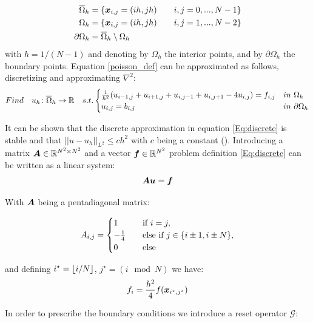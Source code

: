 \documentclass{rescience} %
\begin{document}
\begin{align*}
\overline{\Omega}_h &= \{{\bm{x}}_{i,j} = (ih, jh) \qquad i,j = 0,...,N-1 \} \\
{\Omega}_h &= \{{\bm{x}}_{i,j} = (ih, jh) \qquad i,j = 1,...,N-2 \} \\
\partial\Omega_h &= \overline{\Omega}_h \setminus {\Omega}_h
\end{align*}
with $h=1/(N-1)$ and denoting by ${\Omega}_h$ the interior points, and by $\partial\Omega_h$ the boundary points.
Equation \ref{poisson_def} can be approximated as follows, discretizing and approximating $\nabla^2$:
\begin{equation}
Find \quad u_h \colon \overline{\Omega}_h \to {\mathbb{R}} \quad s.t.
\begin{cases}
\frac{1}{h^2}(u_{i-1,j} + u_{i+1,j} + u_{i,j-1} + u_{i,j+1} - 4u_{i,j})=f_{i,j} & in \ \Omega_h \\
u_{i,j} = b_{i,j} & in \ \partial\Omega_h \\
\end{cases}
\label{Eq:discrete}
\end{equation}

It can be shown that the discrete approximation in equation \ref{Eq:discrete} is stable and that $||u-u_h||_{L^2}\leq c h^2$ with $c$ being a constant (\cite{finitedif}).
Introducing a matrix ${\bm{A}} \in {\mathbb{R}}^{N^2\times N^2}$ and a vector ${\bm{f}}\in {\mathbb{R}}^{N^2}$ problem definition \ref{Eq:discrete} can be written as a linear system: 
\begin{equation}
    {\bm{A}} {\bm{u}} = {\bm{f}}
    \label{Eq:system}
\end{equation}

With ${\bm{A}}$ being a pentadiagonal matrix:

\begin{equation*}
{A}_{i, j} = 
\begin{cases}
    1       & \quad \text{if } i = j, \\
    -\frac{1}{4} & \quad \text{else if } j \in \{i \pm 1, i \pm N\}, \\
    0       & \quad \text{else}
\end{cases}    
\end{equation*}

and defining $i^{\star}=\lfloor i/N \rfloor$, $j^{\star}=(i\mod N)$ we have:
\begin{align*}
    {f}_i = \frac{h^2}{4}f({\bm{x}}_{i^{\star},j^{\star}})
\end{align*}

In order to prescribe the boundary conditions we introduce a reset operator $\mathcal{G}$:
\end{document}
